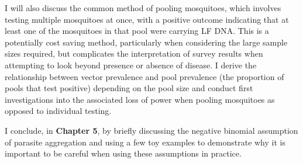 I will also discuss the common method of pooling mosquitoes, which involves testing multiple mosquitoes at once, with a positive outcome indicating that at least one of the mosquitoes in that pool were carrying LF DNA. This is a potentially cost saving method, particularly when considering the large sample sizes required, but complicates the interpretation of survey results when attempting to look beyond presence or absence of disease. I derive the relationship between vector prevalence and pool prevalence (the proportion of pools that test positive) depending on the pool size and conduct first investigations into the associated loss of power when pooling mosquitoes as opposed to individual testing.

I conclude, in \textbf{Chapter 5}, by briefly discussing the negative binomial assumption of parasite aggregation and using a few toy examples to demonstrate why it is important to be careful when using these assumptions in practice.